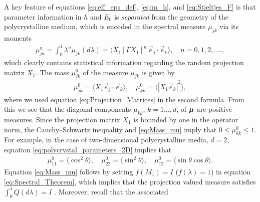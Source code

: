 \documentclass[11pt]{amsart}
\newcommand\bmu{\mbox{\boldmath${\mu}$}}
\begin{document}
A key feature of equations \eqref{eq:eff_eps_def}, \eqref{eq:m_h}, and
\eqref{eq:Stieltjes_F} is that parameter information in $h$ and
$E_0$ is \emph{separated} from the geometry of the polycrystalline
medium, which is encoded in the spectral measure $\mu_{jk}$ via its
moments
%
\begin{align}\label{eq:Moments_mu}
  \mu_{jk}^n=\int_0^1\lambda^n\mu_{jk}(d\lambda)
       =\langle X_1[\Gamma X_1]^n\,\vec{e}_j\cdot\vec{e}_k\rangle,
  \quad n=0,1,2,\ldots.,
\end{align}
%
which clearly contains statistical information regarding
the random projection matrix $X_1$. The mass $\mu_{jk}^0$ of the measure
$\mu_{jk}$ is given by  
%
\begin{align}\label{eq:Mass_mu}
  \mu_{jk}^0=\langle X_1\vec{e}_j\cdot\vec{e}_k\rangle, \quad
  \mu_{kk}^0=\langle |X_1\vec{e}_k|^2\rangle,
\end{align}
%
where we used equation \eqref{eq:Projection_Matrices} in the second
formula. From this we see that the diagonal components $\mu_{kk}$,
$k=1\ldots,d$, of $\bmu$ are positive measures.
Since the projection 
matrix $X_1$ is bounded by one in the operator norm, the
Cauchy--Schwartz inequality and \eqref{eq:Mass_mu} imply that
$0\leq\mu_{kk}^0\leq1$. For example, in the case of  
two-dimensional polycrystalline media, $d=2$, equation
\eqref{eq:polycrystal_parameters_2D} implies that 
%
\begin{align}
  \mu_{11}^0=\langle\cos^2\theta\rangle, \quad
  \mu_{22}^0=\langle\sin^2\theta\rangle, \quad
  \mu_{12}^0=\langle\sin\theta\cos\theta\rangle.
\end{align}
%
Equation \eqref{eq:Mass_mu} follows by  setting    
$f(M_1)=I$ ($f(\lambda)=1$) in equation  \eqref{eq:Spectral_Theorem}, which implies
that the projection valued measure satisfies $\int_0^1Q(d\lambda)=I$
\cite{Reed-1980,Stone:64}. Moreover, recall that the associated
\end{document}
